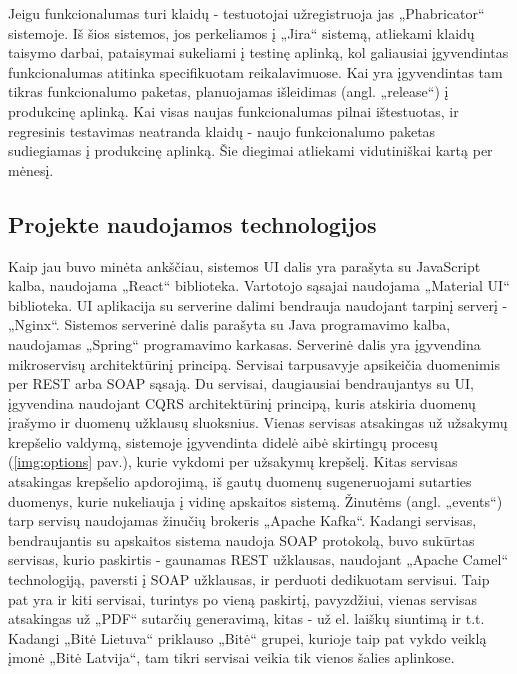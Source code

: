 Jeigu funkcionalumas turi klaidų - testuotojai užregistruoja jas „Phabricator“ sistemoje. Iš šios sistemos, jos perkeliamos į „Jira“ sistemą, atliekami klaidų taisymo darbai, pataisymai
sukeliami į testinę aplinką, kol galiausiai įgyvendintas funkcionalumas atitinka specifikuotam reikalavimuose. Kai yra įgyvendintas tam tikras funkcionalumo paketas, planuojamas
išleidimas (angl. „release“) į produkcinę aplinką. Kai visas naujas funkcionalumas pilnai ištestuotas, ir regresinis testavimas neatranda klaidų - naujo funkcionalumo paketas
sudiegiamas į produkcinę aplinką. Šie diegimai atliekami vidutiniškai kartą per mėnesį.


\subsection{Projekte naudojamos technologijos}
Kaip jau buvo minėta ankščiau, sistemos UI dalis yra parašyta su JavaScript kalba, naudojama „React“ biblioteka. Vartotojo sąsajai naudojama „Material UI“ biblioteka.
UI aplikacija su serverine dalimi bendrauja naudojant tarpinį serverį - „Nginx“.
Sistemos serverinė dalis parašyta su Java programavimo kalba, naudojamas „Spring“ programavimo karkasas. Serverinė dalis yra
įgyvendina mikroservisų architektūrinį principą. Servisai tarpusavyje apsikeičia duomenimis per
REST arba SOAP sąsają. Du servisai, daugiausiai bendraujantys su UI, įgyvendina naudojant CQRS architektūrinį principą,
kuris atskiria duomenų įrašymo ir duomenų užklausų sluoksnius. Vienas servisas atsakingas už užsakymų krepšelio valdymą, sistemoje įgyvendinta didelė
aibė skirtingų procesų (\ref{img:options} pav.),
kurie vykdomi per užsakymų krepšelį. Kitas servisas atsakingas krepšelio apdorojimą, iš gautų duomenų sugeneruojami sutarties duomenys, kurie nukeliauja į vidinę apskaitos sistemą.
Žinutėms (angl. „events“) tarp servisų naudojamas žinučių brokeris „Apache Kafka“. Kadangi servisas, bendraujantis su apskaitos sistema naudoja SOAP protokolą, buvo sukūrtas
servisas, kurio paskirtis - gaunamas REST užklausas, naudojant „Apache Camel“ technologiją, paversti į SOAP užklausas, ir perduoti dedikuotam servisui.
Taip pat yra ir kiti servisai, turintys po vieną paskirtį, pavyzdžiui, vienas servisas atsakingas už „PDF“ sutarčių generavimą, kitas - už el. laiškų siuntimą ir t.t.
Kadangi „Bitė Lietuva“ priklauso „Bitė“ grupei, kurioje taip pat vykdo veiklą įmonė „Bitė Latvija“, tam tikri servisai veikia tik vienos šalies aplinkose.

